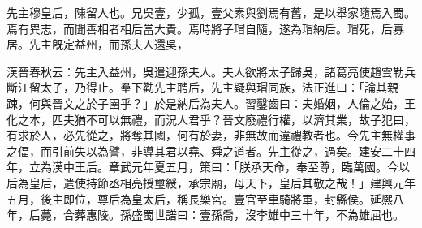 
\begin{pinyinscope}
先主穆皇后，陳留人也。兄吳壹，少孤，壹父素與劉焉有舊，是以舉家隨焉入蜀。焉有異志，而聞善相者相后當大貴。焉時將子瑁自隨，遂為瑁納后。瑁死，后寡居。先主旣定益州，而孫夫人還吳，

漢晉春秋云：先主入益州，吳遣迎孫夫人。夫人欲將太子歸吳，諸葛亮使趙雲勒兵斷江留太子，乃得止。羣下勸先主聘后，先主疑與瑁同族，法正進曰：「論其親踈，何與晉文之於子圉乎？」於是納后為夫人。習鑿齒曰：夫婚姻，人倫之始，王化之本，匹夫猶不可以無禮，而況人君乎？晉文廢禮行權，以濟其業，故子犯曰，有求於人，必先從之，將奪其國，何有於妻，非無故而違禮教者也。今先主無權事之偪，而引前失以為譬，非導其君以堯、舜之道者。先主從之，過矣。建安二十四年，立為漢中王后。章武元年夏五月，策曰：「朕承天命，奉至尊，臨萬國。今以后為皇后，遣使持節丞相亮授璽綬，承宗廟，母天下，皇后其敬之哉！」建興元年五月，後主即位，尊后為皇太后，稱長樂宮。壹官至車騎將軍，封縣侯。延熈八年，后薨，合葬惠陵。孫盛蜀世譜曰：壹孫喬，沒李雄中三十年，不為雄屈也。


\end{pinyinscope}